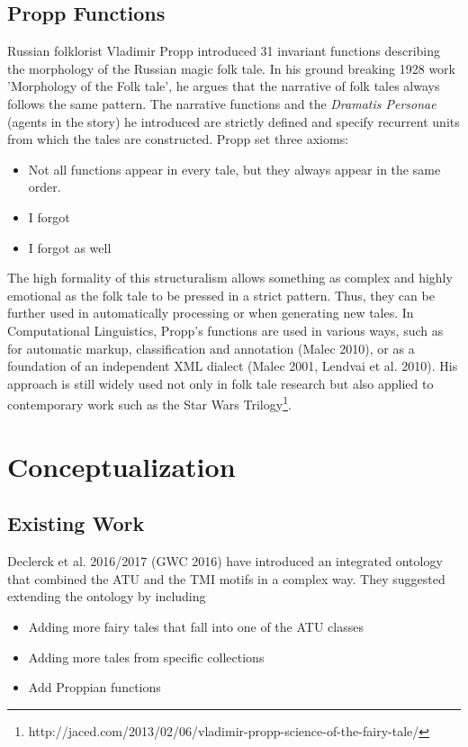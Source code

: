 \documentclass[10pt,a4paper]{article}
\begin{document}
	\subsection{Propp Functions} 
	Russian folklorist Vladimir Propp introduced 31 invariant functions describing the morphology of the Russian magic folk tale. In his ground breaking 1928 work 'Morphology of the Folk tale', he argues that the narrative of folk tales always follows the same pattern. The narrative functions and the \textit{Dramatis Personae} (agents in the story) he introduced are strictly defined and specify recurrent units from which the tales are constructed. 
	Propp set three axioms: 
	
	\begin{itemize}
		\item Not all functions appear in every tale, but they always appear in the same order. 
		\item I forgot
		\item I forgot as well 
	
	\end{itemize}
	
The high formality of this structuralism allows something as complex and highly emotional as the folk tale to be pressed in a strict pattern. Thus, they can be further used in automatically processing or when generating new tales. In Computational Linguistics, Propp's functions are used in various ways, such as for automatic markup, classification and annotation (Malec 2010), or as a foundation of an independent XML dialect (Malec 2001,  Lendvai et al. 2010). 
	His approach is still widely used not only in folk tale research but also applied to contemporary work such as the Star Wars Trilogy\footnote{http://jaced.com/2013/02/06/vladimir-propp-science-of-the-fairy-tale/}.   

\section{Conceptualization}
	\subsection{Existing Work} 
	Declerck et al. 2016/2017 (GWC 2016) have introduced an integrated ontology that combined the ATU and the TMI motifs in a complex way. They suggested extending the ontology by including 
	
	\begin{itemize}
		\item Adding more fairy tales that fall into one of the ATU classes
		\item Adding more tales from specific collections
		\item Add Proppian functions
		
	\end{itemize}	  
	
\end{document}
